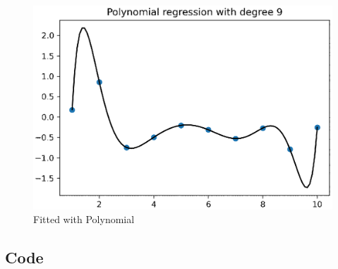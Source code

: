 \begin{figure}[!ht]
	\includegraphics{question_1/Fitted.eps} 
	\caption{Fitted with Polynomial}
\end{figure} 

\clearpage
\subsection{Code}
